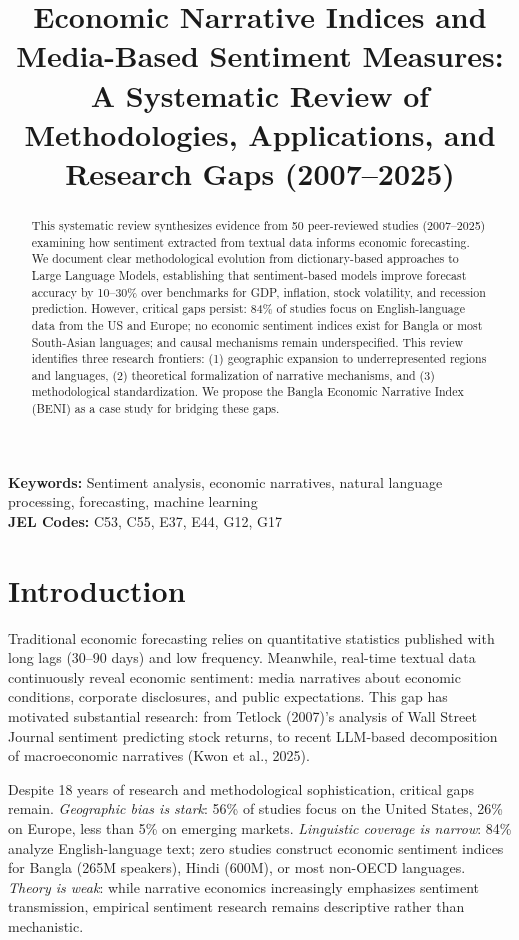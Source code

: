 \documentclass[11pt]{article}
\title{\textbf{Economic Narrative Indices and Media-Based Sentiment Measures:\\
A Systematic Review of Methodologies, Applications, and Research Gaps (2007--2025)}}
\author{} %
\date{}
\begin{document}
\maketitle

\begin{abstract}
This systematic review synthesizes evidence from 50 peer-reviewed studies (2007--2025) examining how sentiment extracted from textual data informs economic forecasting. We document clear methodological evolution from dictionary-based approaches to Large Language Models, establishing that sentiment-based models improve forecast accuracy by 10--30\% over benchmarks for GDP, inflation, stock volatility, and recession prediction. However, critical gaps persist: 84\% of studies focus on English-language data from the US and Europe; no economic sentiment indices exist for Bangla or most South-Asian languages; and causal mechanisms remain underspecified. This review identifies three research frontiers: (1) geographic expansion to underrepresented regions and languages, (2) theoretical formalization of narrative mechanisms, and (3) methodological standardization. We propose the Bangla Economic Narrative Index (BENI) as a case study for bridging these gaps.
\end{abstract}

\noindent \textbf{Keywords:} Sentiment analysis, economic narratives, natural language processing, forecasting, machine learning \\
\textbf{JEL Codes:} C53, C55, E37, E44, G12, G17

\section{Introduction}

Traditional economic forecasting relies on quantitative statistics published with long lags (30--90 days) and low frequency. Meanwhile, real-time textual data continuously reveal economic sentiment: media narratives about economic conditions, corporate disclosures, and public expectations. This gap has motivated substantial research: from Tetlock (2007)'s analysis of Wall Street Journal sentiment predicting stock returns, to recent LLM-based decomposition of macroeconomic narratives (Kwon et al., 2025).

Despite 18 years of research and methodological sophistication, critical gaps remain. \textit{Geographic bias is stark}: 56\% of studies focus on the United States, 26\% on Europe, less than 5\% on emerging markets. \textit{Linguistic coverage is narrow}: 84\% analyze English-language text; zero studies construct economic sentiment indices for Bangla (265M speakers), Hindi (600M), or most non-OECD languages. \textit{Theory is weak}: while narrative economics increasingly emphasizes sentiment transmission, empirical sentiment research remains descriptive rather than mechanistic.
\end{document}
